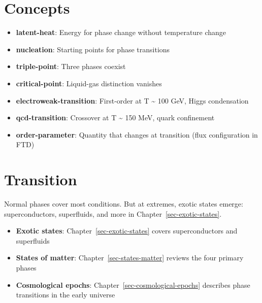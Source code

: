 \documentclass[
  11pt,
  letterpaper,
  twoside,
  openright]{book}
\providecommand{\tightlist}{%
  \setlength{\itemsep}{0pt}\setlength{\parskip}{0pt}}
\begin{document}
\section{Concepts}\label{concepts-9}

\begin{itemize}
\tightlist
\item
  \textbf{latent-heat}: Energy for phase change without temperature
  change
\item
  \textbf{nucleation}: Starting points for phase transitions
\item
  \textbf{triple-point}: Three phases coexist
\item
  \textbf{critical-point}: Liquid-gas distinction vanishes
\item
  \textbf{electroweak-transition}: First-order at T \textasciitilde{}
  100 GeV, Higgs condensation
\item
  \textbf{qcd-transition}: Crossover at T \textasciitilde{} 150 MeV,
  quark confinement
\item
  \textbf{order-parameter}: Quantity that changes at transition (flux
  configuration in FTD)
\end{itemize}

\section{Transition}\label{transition-9}

Normal phases cover most conditions. But at extremes, exotic states
emerge: superconductors, superfluids, and more in
Chapter~\ref{sec-exotic-states}.

\begin{tcolorbox}[enhanced jigsaw, coltitle=black, colbacktitle=quarto-callout-tip-color!10!white, toprule=.15mm, colframe=quarto-callout-tip-color-frame, arc=.35mm, opacityback=0, bottomtitle=1mm, toptitle=1mm, breakable, colback=white, titlerule=0mm, opacitybacktitle=0.6, title=\textcolor{quarto-callout-tip-color}{\faLightbulb}\hspace{0.5em}{Related Topics}, rightrule=.15mm, bottomrule=.15mm, leftrule=.75mm, left=2mm]

\begin{itemize}
\tightlist
\item
  \textbf{Exotic states}: Chapter~\ref{sec-exotic-states} covers
  superconductors and superfluids
\item
  \textbf{States of matter}: Chapter~\ref{sec-states-matter} reviews the
  four primary phases
\item
  \textbf{Cosmological epochs}: Chapter~\ref{sec-cosmological-epochs}
  describes phase transitions in the early universe
\end{itemize}

\end{tcolorbox}
\end{document}
